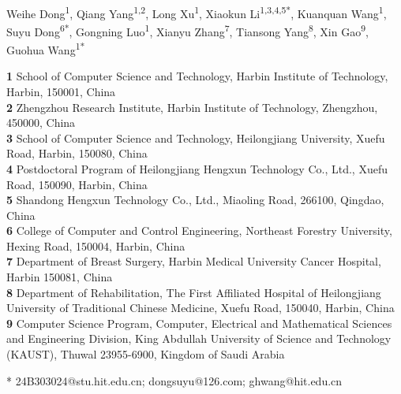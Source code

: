 \documentclass[10pt,letterpaper]{article}
\begin{document}
\vspace*{0.2in}

\begin{flushleft}
{\Large
\textbf{} %
}
\newline
\\
Weihe Dong\textsuperscript{1},
Qiang Yang\textsuperscript{1,2},
Long Xu\textsuperscript{1},
Xiaokun Li\textsuperscript{1,3,4,5*},
Kuanquan Wang\textsuperscript{1},
Suyu Dong\textsuperscript{6*},
Gongning Luo\textsuperscript{1},
Xianyu Zhang\textsuperscript{7},
Tiansong Yang\textsuperscript{8},
Xin Gao\textsuperscript{9},
Guohua Wang\textsuperscript{1*}

\bigskip
\textbf{1} School of Computer Science and Technology, Harbin Institute of Technology, Harbin, 150001, China
\\
\textbf{2} Zhengzhou Research Institute, Harbin Institute of Technology, Zhengzhou, 450000, China
\\
\textbf{3} School of Computer Science and Technology, Heilongjiang University, Xuefu Road, Harbin, 150080, China
\\
\textbf{4} Postdoctoral Program of Heilongjiang Hengxun Technology Co., Ltd., Xuefu Road, 150090, Harbin, China
\\
\textbf{5} Shandong Hengxun Technology Co., Ltd., Miaoling Road, 266100, Qingdao, China
\\
\textbf{6} College of Computer and Control Engineering, Northeast Forestry University, Hexing Road, 150004, Harbin, China
\\
\textbf{7} Department of Breast Surgery, Harbin Medical University Cancer Hospital, Harbin 150081, China
\\
\textbf{8} Department of Rehabilitation, The First Affiliated Hospital of Heilongjiang University of Traditional Chinese Medicine, Xuefu Road, 150040, Harbin, China
\\
\textbf{9} Computer Science Program, Computer, Electrical and Mathematical Sciences and Engineering Division, King Abdullah University of Science and Technology (KAUST), Thuwal 23955-6900, Kingdom of Saudi Arabia
\\
\bigskip

* 24B303024@stu.hit.edu.cn; dongsuyu@126.com; ghwang@hit.edu.cn

\end{flushleft}
\end{document}
